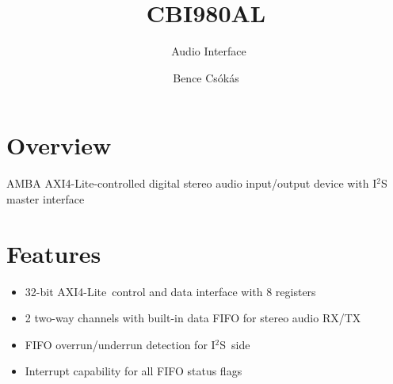 \documentclass{datasheet}
\title{CBI980AL}
\subtitle{\al\ Audio Interface}
\author{Bence Csókás}
\newcommand{\iis}{I$^2$S}
\newcommand{\al}{AXI4-Lite}
\begin{document}
	\maketitle

	\section{Overview}
	AMBA \al\cite{a4l-spec}-controlled digital stereo audio input/output device with \iis\cite{i2s-spec} master interface

	\section{Features}
	\begin{itemize}
		\item 32-bit \al\ control and data interface with 8 registers
		\item 2 two-way channels with built-in data FIFO for stereo audio RX/TX
		\item FIFO overrun/underrun detection for \iis\ side
		\item Interrupt capability for all FIFO status flags
	\end{itemize}

	\vfill\break
\end{document}
